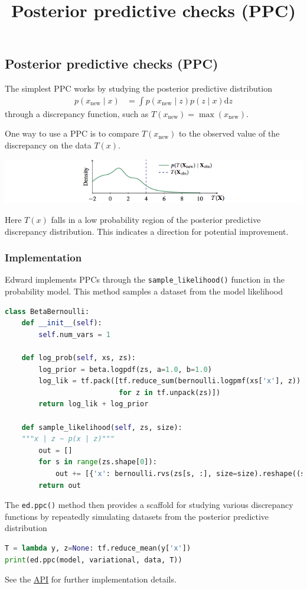 \title{Posterior predictive checks (PPC)}

\subsection{Posterior predictive checks (PPC)}

The simplest PPC works by studying the posterior predictive distribution
\begin{align*}
  p(x_\text{new} \mid x)
  &=
  \int
  p(x_\text{new} \mid z)
  p(z \mid x)
  \text{d} z
\end{align*}
through a discrepancy function, such as $T(x_\text{new}) = \max(x_\text{new})$.

One way to use a PPC is to compare $T(x_\text{new})$ to the observed value
of the discrepancy on the data $T(x)$. 

\includegraphics{images/ppc.png}

Here $T(x)$ falls in a low probability region of the posterior
predictive discrepancy distribution. This indicates a direction for potential
improvement.

\subsubsection{Implementation}

Edward implements PPCs through the \texttt{sample_likelihood()}
function in the probability model. This method samples a dataset from the
model likelihood
\begin{lstlisting}[language=Python]
class BetaBernoulli:
    def __init__(self):
        self.num_vars = 1

    def log_prob(self, xs, zs):
        log_prior = beta.logpdf(zs, a=1.0, b=1.0)
        log_lik = tf.pack([tf.reduce_sum(bernoulli.logpmf(xs['x'], z))
                           for z in tf.unpack(zs)])
        return log_lik + log_prior

    def sample_likelihood(self, zs, size):
    """x | z ~ p(x | z)"""
        out = []
        for s in range(zs.shape[0]):
            out += [{'x': bernoulli.rvs(zs[s, :], size=size).reshape((size,))}]
        return out
\end{lstlisting}

The \texttt{ed.ppc()} method then provides a scaffold for studying
various discrepancy functions by repeatedly simulating datasets from the
posterior predictive distribution
\begin{lstlisting}[language=Python]
T = lambda y, z=None: tf.reduce_mean(y['x'])
print(ed.ppc(model, variational, data, T))  
\end{lstlisting}

See the \href{api/index.html}{API} for further implementation details.
